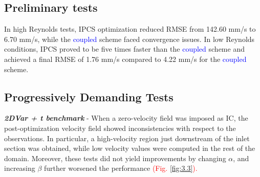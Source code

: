 \subsection*{Preliminary tests}
In high Reynolds tests, IPCS optimization reduced RMSE from 142.60 mm/s to 6.70 mm/s, while the \textcolor{blue}{coupled} scheme faced convergence issues. In low Reynolds conditions, IPCS proved to be five times faster than the \textcolor{blue}{coupled} scheme and achieved a final RMSE of 1.76 mm/s compared to 4.22 mm/s for the \textcolor{blue}{coupled} scheme.

\subsection*{Progressively Demanding Tests}
\textbf{\textit{2DVar + t benchmark}} - When a zero-velocity field was imposed as IC, the post-optimization velocity field showed inconsistencies with respect to the observations.
In particular, a high-velocity region just downstream of the inlet section was obtained, while low velocity values were computed in the rest of the domain.
Moreover, these tests did not yield improvements by changing \(\alpha\), and increasing \(\beta\) further worsened the performance \textcolor{red}{(Fig. \ref{fig:3.3}).}

